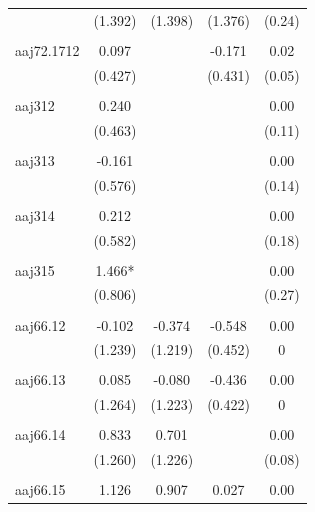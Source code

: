 \documentclass[12pt, a4paper]{article}
\begin{document}
{\begin{longtable}{@{\extracolsep{5pt}}lcccc}
				& (1.392)    & (1.398)    & (1.376)   & (0.24)  \\
				&            &            &           &         \\
				aaj72.1712 & 0.097      &            & -0.171    & 0.02    \\
				& (0.427)    &            & (0.431)   & (0.05)  \\
				&            &            &           &         \\
				aaj312     & 0.240      &            &           & 0.00    \\
				& (0.463)    &            &           & (0.11)  \\
				&            &            &           &         \\
				aaj313     & -0.161     &            &           & 0.00    \\
				& (0.576)    &            &           & (0.14)  \\
				&            &            &           &         \\
				aaj314     & 0.212      &            &           & 0.00    \\
				& (0.582)    &            &           & (0.18)  \\
				&            &            &           &         \\
				aaj315     & 1.466*     &            &           & 0.00    \\
				& (0.806)    &            &           & (0.27)  \\
				&            &            &           &         \\
				aaj66.12   & -0.102     & -0.374     & -0.548    & 0.00    \\
				& (1.239)    & (1.219)    & (0.452)   & 0       \\
				&            &            &           &         \\
				aaj66.13   & 0.085      & -0.080     & -0.436    & 0.00    \\
				& (1.264)    & (1.223)    & (0.422)   & 0       \\
				&            &            &           &         \\
				aaj66.14   & 0.833      & 0.701      &           & 0.00    \\
				& (1.260)    & (1.226)    &           & (0.08)  \\
				&            &            &           &         \\
				aaj66.15   & 1.126      & 0.907      & 0.027     & 0.00    \\

\end{longtable}}
\end{document}
